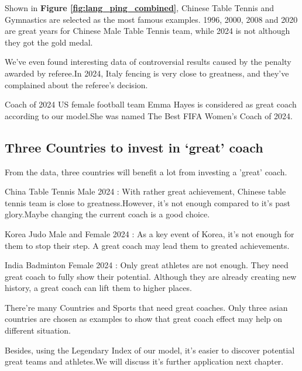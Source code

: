 Shown in \textbf{Figure \ref{fig:lang_ping_combined}}, Chinese Table Tennis and Gymnastics are selected as the most famous examples. 1996, 2000, 2008 and 2020 are great years for Chinese Male Table Tennis team, while 2024 is not although they got the gold medal.

We've even found interesting data of controversial results caused by the penalty awarded by referee.In 2024, Italy fencing is very close to greatness, and they've complained about the referee's decision.\cite{4}

Coach of 2024 US female football team Emma Hayes is considered as great coach according to our model.She was named The Best FIFA Women's Coach of 2024.\cite{5}

\subsection{Three Countries to invest in `great' coach}

From the data, three countries will benefit a lot from investing a 'great' coach.

China Table Tennis Male 2024 : With rather great achievement, Chinese table tennis team is close to greatness.However, it's not enough compared to it's past glory.Maybe changing the current coach is a good choice.

Korea Judo Male and Female 2024 : As a key event of Korea, it's not enough for them to stop their step. A great coach may lead them to greated achievements.

India Badminton Female 2024 : Only great athletes are not enough. They need great coach to fully show their potential. Although they are already creating new history, a great coach can lift them to higher places.

There're many Countries and Sports that need great coaches. Only three asian countries are chosen as examples to show that  great coach effect may help on different situation.

Besides, using the Legendary Index of our model, it's easier to discover potential great teams and athletes.We will discuss it's further application next chapter.
